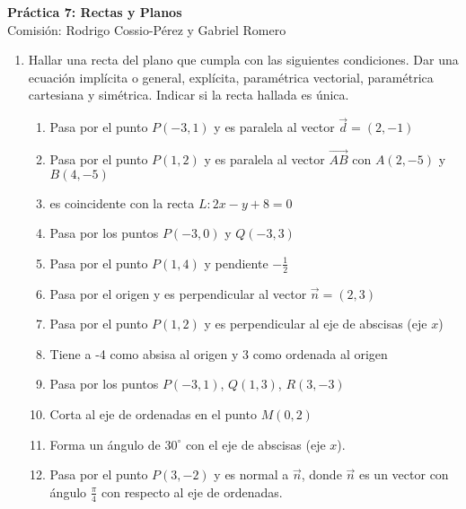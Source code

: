 \documentclass[a4paper]{article}
\newcommand{\exercise}{\item}
\begin{document}
\noindent \hrulefill 
\vspace{-7pt}
\begin{center} 
	\textbf{ Práctica 7: Rectas y Planos } \\
	Comisión: Rodrigo Cossio-Pérez y Gabriel Romero
\end{center}
\vspace{-10pt}
\hrulefill


\begin{enumerate}

	\exercise Hallar una recta del plano que cumpla con las siguientes condiciones. Dar una ecuación implícita o general, explícita, paramétrica vectorial, paramétrica cartesiana y simétrica. Indicar si la recta hallada es única.
	\begin{enumerate} [label=(\alph*)]
		
		\item Pasa por el punto $P(-3,1)$ y es paralela al vector $\vec{d}=(2,-1)$

		\item Pasa por el punto $P(1,2)$ y es paralela al vector $\overrightarrow{AB}$ con $A(2,-5)$ y $B(4,-5)$

		\item es coincidente con la recta $L: 2x-y+8=0$

		\item Pasa por los puntos $P(-3,0)$ y $Q(-3,3)$

		\item Pasa por el punto $P(1,4)$ y pendiente $\displaystyle{-\frac{1}{2}}$

		\item Pasa por el origen y es perpendicular al vector $\vec{n}=(2,3)$

		\item Pasa por el punto $P(1,2)$ y es perpendicular al eje de abscisas (eje $x$)

		\item Tiene a -4 como absisa al origen y 3 como ordenada al origen

		\item Pasa por los puntos $P(-3,1)$, $Q(1,3)$, $R(3,-3)$

		\item Corta al eje de ordenadas en el punto $M(0,2)$

		\item Forma un ángulo de $30^{\circ}$ con el eje de abscisas (eje $x$).

		\item Pasa por el punto $P(3,-2)$ y es normal a $\vec{n}$, donde $\vec{n}$ es un vector con ángulo $\displaystyle\frac{\pi}{4}$ con respecto al eje de ordenadas.


\end{enumerate}
\end{enumerate}
\end{document}
